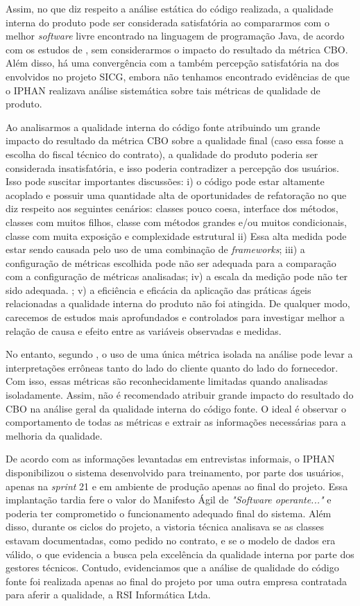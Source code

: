 Assim, no que diz respeito a análise estática do código realizada, a qualidade interna do produto pode ser considerada satisfatória ao compararmos com o melhor \textit{software} livre encontrado na linguagem de programação Java, de acordo com os estudos de , sem considerarmos o impacto do resultado da métrica CBO. Além disso, há uma convergência com a também percepção satisfatória na dos envolvidos no projeto SICG, embora não tenhamos encontrado evidências de que o IPHAN realizava análise sistemática sobre tais métricas de qualidade de produto.

Ao analisarmos a qualidade interna do código fonte atribuindo um grande impacto do resultado da métrica CBO sobre a qualidade final (caso essa fosse a escolha do fiscal técnico do contrato), a qualidade do produto poderia ser considerada insatisfatória, e isso poderia contradizer a percepção dos usuários. Isso pode suscitar importantes discussões: i) o código pode estar altamente acoplado e possuir uma quantidade alta de oportunidades de refatoração no que diz respeito aos seguintes cenários: classes pouco coesa, interface dos métodos, classes com muitos filhos, classe com métodos grandes e/ou muitos condicionais, classe com muita exposição e complexidade estrutural ii) Essa alta medida pode estar sendo causada pelo uso de uma combinação de \textit{frameworks}; iii) a configuração de métricas escolhida pode não ser adequada para a comparação com a configuração de métricas analisadas; iv) a escala da medição pode não ter sido adequada. ; v) a eficiência e eficácia da aplicação das práticas ágeis relacionadas a qualidade interna do produto não foi atingida. De qualquer modo, carecemos de estudos mais aprofundados e controlados para investigar melhor a relação de causa e efeito entre as variáveis observadas e medidas.

No entanto, segundo , o uso de uma única métrica isolada na análise pode levar a interpretações errôneas tanto do lado do cliente quanto do lado do fornecedor. Com isso, essas métricas são reconhecidamente limitadas quando analisadas isoladamente. Assim, não é recomendado atribuir grande impacto do resultado do CBO na análise geral da qualidade interna do código fonte. O ideal é observar o comportamento de todas as métricas e extrair as informações necessárias para a melhoria da qualidade.

De acordo com as informações levantadas em entrevistas informais, o IPHAN disponibilizou o sistema desenvolvido para treinamento, por parte dos usuários, apenas na \textit{sprint} 21 e em ambiente de produção apenas ao final do projeto. Essa implantação tardia fere o valor do Manifesto Ágil de \textit{"Software operante..."} e poderia ter comprometido o funcionamento adequado final do sistema. Além disso, durante os ciclos do projeto, a vistoria técnica analisava se as classes estavam documentadas, como pedido no contrato, e se o modelo de dados era válido, o que evidencia a busca pela excelência da qualidade interna por parte dos gestores técnicos. Contudo, evidenciamos que a análise de qualidade do código fonte foi realizada apenas ao final do projeto por uma outra empresa contratada para aferir a qualidade, a RSI Informática Ltda. 


